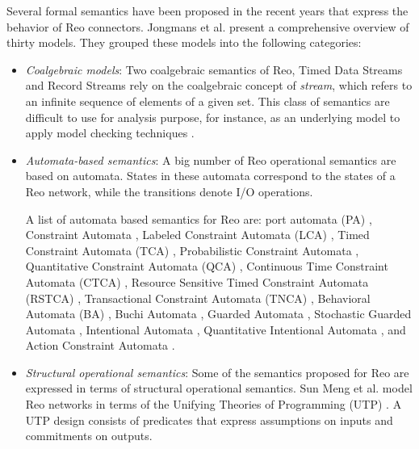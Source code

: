 Several formal semantics have been proposed in the recent years that express the behavior
of Reo connectors.  
Jongmans et al. \cite{sung30semantics} present a comprehensive overview of thirty models. They grouped these models into the following categories: 
\begin{itemize}
 \item \emph{Coalgebraic models}:  Two coalgebraic semantics of Reo, Timed Data Streams \cite{ABTArbab} \cite{Arbab02acoinductive} \cite{comconjan} and Record Streams \cite{izadirecasting} \cite{Izadibuchi} rely on the coalgebraic concept of \emph{stream}, which refers to an infinite sequence of elements of a given set. This class of semantics are difficult to use for analysis purpose, for instance, as an underlying model to apply model checking techniques \cite{sung30semantics}.%

 \item \emph{Automata-based semantics}: A big number of Reo operational semantics are based on automata. States in these automata correspond to the states of a Reo network, while the transitions denote I/O operations. 

A list of automata based semantics for Reo are: port automata (PA) \cite{KC09},
Constraint Automata \cite{BaierCA},
 Labeled Constraint Automata (LCA) \cite{Kppelholz2009688}, Timed Constraint Automata (TCA) \cite{Arbab07MTLTCC},
 Probabilistic Constraint Automata \cite{Baier2005},
 Quantitative Constraint Automata (QCA) \cite{ArbabCMM07} \cite{qosdriven},
 Continuous Time Constraint Automata (CTCA) \cite{baier2006},
Resource Sensitive Timed Constraint Automata (RSTCA) \cite{resMengA07},
Transactional Constraint Automata (TNCA) \cite{ArMengA10}, 
Behavioral Automata (BA) \cite{JoseThesis},
Buchi Automata \cite{izadirecasting} \cite{Izadibuchi}  \cite{KULeuven217958} \cite{Izadibuchi},
Guarded Automata \cite{Bonsangue2012685} \cite{ReoAutomata},
Stochastic Guarded Automata \cite{yjmfolks} \cite{MoonSKA14}, 
Intentional Automata \cite{davidtez},
Quantitative Intentional Automata \cite{prismyoungjoo}, and
Action Constraint Automata \cite{actionautomata}.

 \item \emph{Structural operational semantics}: Some of the semantics proposed for Reo are expressed in terms of structural operational semantics. 
 Sun Meng et al.  \cite{MengAAABR12} model Reo networks in terms of the Unifying Theories of Programming (UTP) \cite{Hoare13}. %
A UTP design consists of predicates that express assumptions on inputs and commitments on outputs. %


\end{itemize}
